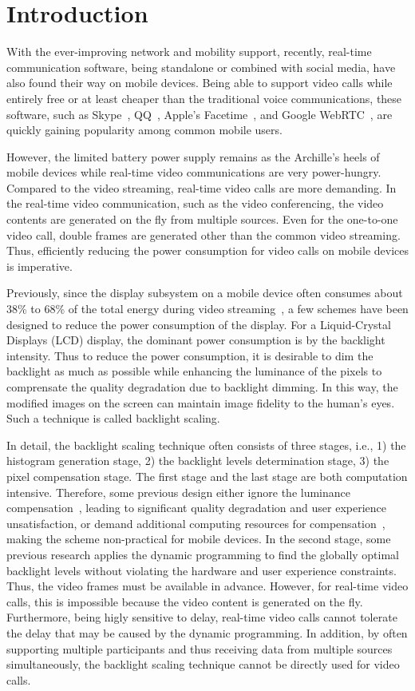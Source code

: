 \section{Introduction}


With the ever-improving network and mobility support, recently,
real-time communication software, being standalone or combined with
social media, have also found their way on mobile devices.  Being able
to support video calls while entirely free or at least cheaper than
the traditional voice communications, these software, such as
Skype~\cite{skype}, QQ~\cite{qq}, Apple's Facetime~\cite{facetime},
and Google WebRTC~\cite{webrtcproject}, are quickly gaining popularity
among common mobile users.


However, the limited battery power supply remains as the Archille's
heels of mobile devices while real-time video communications are very
power-hungry. Compared to the video streaming, real-time video calls
are more demanding. In the real-time video communication, such as the
video conferencing, the video contents are generated on the fly from
multiple sources. Even for the one-to-one video call, double frames
are generated other than the common video streaming. Thus, efficiently
reducing the power consumption for video calls on mobile devices is
imperative.


Previously, since the display subsystem on a mobile device often
consumes about 38\% to 68\% of the total energy during video
streaming~\cite{AG10}, a few schemes have been designed to reduce the
power consumption of the display. For a Liquid-Crystal Displays (LCD)
display, the dominant power consumption is by the backlight
intensity. Thus to reduce the power consumption, it is desirable to
dim the backlight as much as possible while enhancing the luminance of
the pixels to comprensate the quality degradation due to backlight
dimming.  In this way, the modified images on the screen can maintain
image fidelity to the human's eyes. Such a technique is called
backlight scaling.

In detail, the backlight scaling technique often consists of three
stages, i.e., 1) the histogram generation stage, 2) the backlight
levels determination stage, 3) the pixel compensation stage. The first
stage and the last stage are both computation intensive. Therefore,
some previous design either ignore the luminance
compensation~\cite{HLH11}, leading to significant quality degradation
and user experience unsatisfaction, or demand additional computing
resources for compensation~\cite{LHH14}, making the scheme
non-practical for mobile devices.  In the second stage, some previous
research applies the dynamic programming to find the globally optimal
backlight levels without violating the hardware and user experience
constraints. Thus, the video frames must be available in advance.
However, for real-time video calls, this is impossible because the
video content is generated on the fly.  Furthermore, being higly
sensitive to delay, real-time video calls cannot tolerate the delay
that may be caused by the dynamic programming. In addition, by often
supporting multiple participants and thus receiving data from multiple
sources simultaneously, the backlight scaling technique cannot be
directly used for video calls.

